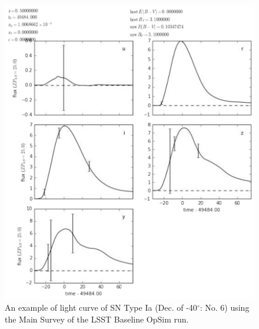 \begin{figure}[tbh!]
\includegraphics[angle=0,width=0.99\hsize:,clip]{figs/supernova/LCDecminus40no40.pdf}
\caption{An example of light curve of SN Type Ia (Dec. of -40$^{\circ}$: No. 6) using
the Main Survey of the LSST Baseline OpSim run. }
\label{fig:SNIaLCminus40}
\end{figure}

